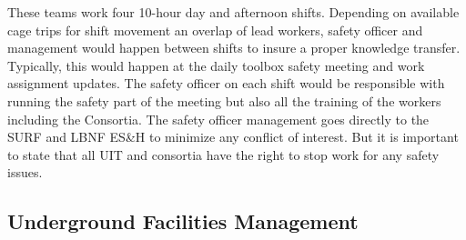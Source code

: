 These teams work four 10-hour day and afternoon shifts.  Depending on
available cage trips for shift movement an overlap of lead workers,
safety officer and management would happen between shifts to insure a
proper knowledge transfer.  Typically, this would happen at the daily
toolbox safety meeting and work assignment updates.  The safety
officer on each shift would be responsible with running the safety
part of the meeting but also all the training of the workers including
the Consortia. The safety officer management goes directly to the SURF
and LBNF ES\&H to minimize any conflict of interest.  But it is
important to state that all UIT and consortia have the right to stop
work for any safety issues.

\subsection{Underground Facilities Management}

